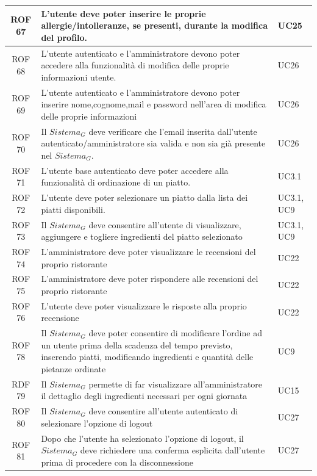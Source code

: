 \documentclass[12pt, oneside]{article}
\begin{document}
\begin{longtable}{|c|p{14cm}|p{2cm}|}
    ROF 67 & L'utente deve poter inserire le proprie allergie/intolleranze, se presenti, durante la modifica del profilo.  & UC25  \\
    \hline
    ROF 68 & L'utente autenticato e l'amministratore devono poter accedere alla funzionalità di modifica delle proprie informazioni utente.  & UC26  \\
    \hline
    ROF 69 & L'utente autenticato e l'amministratore devono poter inserire nome,cognome,mail e password nell'area di  modifica delle proprie informazioni  & UC26  \\
    \hline
    ROF 70 & Il $\textit{Sistema}_G$ deve verificare che l'email inserita dall'utente autenticato/amministratore sia valida e non sia già presente nel $\textit{Sistema}_G$.  & UC26  \\
    \hline
    ROF 71 & L'utente base autenticato deve poter accedere alla funzionalità di ordinazione di un piatto.  & UC3.1  \\
    \hline
    ROF 72 & L'utente deve poter selezionare un piatto dalla lista dei piatti disponibili.  & UC3.1, UC9  \\
    \hline
    ROF 73 & Il $\textit{Sistema}_G$ deve consentire all'utente di visualizzare, aggiungere e togliere ingredienti del piatto selezionato  & UC3.1, UC9  \\
    \hline
    ROF 74 & L'amministratore deve poter visualizzare le recensioni del proprio ristorante & UC22 \\ 
    \hline
    ROF 75 & L'amministratore deve poter rispondere alle recensioni del proprio ristorante & UC22 \\
    \hline
    ROF 76 & L'utente deve poter visualizzare le risposte alla proprio recensione & UC22 \\
    \hline
    ROF 78 & Il $\textit{Sistema}_G$ deve poter consentire di modificare l'ordine ad un utente prima della scadenza del tempo previsto, inserendo piatti, modificando ingredienti e quantità delle pietanze ordinate & UC9 \\
    \hline
    RDF 79 & Il $\textit{Sistema}_G$ permette di far visualizzare all'amministratore il dettaglio degli ingredienti necessari per ogni giornata & UC15 \\
    \hline
    ROF 80 & Il $\textit{Sistema}_G$ deve consentire all'utente autenticato di selezionare l'opzione di logout & UC27 \\
    \hline
    ROF 81 & Dopo che l'utente ha selezionato l'opzione di logout, il $\textit{Sistema}_G$ deve richiedere una conferma esplicita dall'utente prima di procedere con la disconnessione & UC27 \\ 

\end{longtable}
\end{document}
